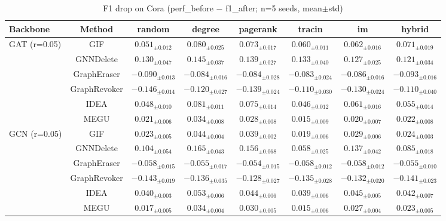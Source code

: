 
\begin{table}[t]
\centering\small
\setlength{\tabcolsep}{4pt}
\caption{F1 drop on Cora (perf\_before $-$ f1\_after; n=5 seeds, mean$\pm$std)}
\label{tab:phaseB-f1_drop-cora}
\begin{tabular}{lccccccc}
\toprule
Backbone & Method & random & degree & pagerank & tracin & im & hybrid \\
\midrule
\multirow{6}{*}{GAT (r=0.05)} & GIF & $0.051_{\pm 0.012}$ & $0.080_{\pm 0.025}$ & $0.073_{\pm 0.017}$ & $0.060_{\pm 0.011}$ & $0.062_{\pm 0.016}$ & $0.071_{\pm 0.019}$ \\
 & GNNDelete & $0.130_{\pm 0.047}$ & $0.145_{\pm 0.037}$ & $0.139_{\pm 0.027}$ & $0.133_{\pm 0.040}$ & $0.127_{\pm 0.025}$ & $0.121_{\pm 0.034}$ \\
 & GraphEraser & $-0.090_{\pm 0.013}$ & $-0.084_{\pm 0.016}$ & $-0.084_{\pm 0.028}$ & $-0.083_{\pm 0.024}$ & $-0.086_{\pm 0.016}$ & $-0.093_{\pm 0.016}$ \\
 & GraphRevoker & $-0.146_{\pm 0.014}$ & $-0.120_{\pm 0.027}$ & $-0.139_{\pm 0.024}$ & $-0.110_{\pm 0.030}$ & $-0.130_{\pm 0.024}$ & $-0.110_{\pm 0.040}$ \\
 & IDEA & $0.048_{\pm 0.010}$ & $0.081_{\pm 0.011}$ & $0.075_{\pm 0.014}$ & $0.046_{\pm 0.012}$ & $0.061_{\pm 0.016}$ & $0.055_{\pm 0.014}$ \\
 & MEGU & $0.021_{\pm 0.006}$ & $0.034_{\pm 0.008}$ & $0.028_{\pm 0.008}$ & $0.015_{\pm 0.009}$ & $0.020_{\pm 0.007}$ & $0.022_{\pm 0.008}$ \\
\midrule
\multirow{6}{*}{GCN (r=0.05)} & GIF & $0.023_{\pm 0.005}$ & $0.044_{\pm 0.004}$ & $0.039_{\pm 0.002}$ & $0.019_{\pm 0.006}$ & $0.029_{\pm 0.006}$ & $0.024_{\pm 0.003}$ \\
 & GNNDelete & $0.104_{\pm 0.054}$ & $0.165_{\pm 0.043}$ & $0.156_{\pm 0.068}$ & $0.058_{\pm 0.025}$ & $0.137_{\pm 0.042}$ & $0.085_{\pm 0.018}$ \\
 & GraphEraser & $-0.058_{\pm 0.015}$ & $-0.055_{\pm 0.017}$ & $-0.054_{\pm 0.015}$ & $-0.058_{\pm 0.012}$ & $-0.058_{\pm 0.012}$ & $-0.055_{\pm 0.010}$ \\
 & GraphRevoker & $-0.143_{\pm 0.019}$ & $-0.136_{\pm 0.035}$ & $-0.128_{\pm 0.027}$ & $-0.135_{\pm 0.028}$ & $-0.132_{\pm 0.020}$ & $-0.141_{\pm 0.023}$ \\
 & IDEA & $0.040_{\pm 0.003}$ & $0.053_{\pm 0.006}$ & $0.044_{\pm 0.006}$ & $0.039_{\pm 0.006}$ & $0.045_{\pm 0.005}$ & $0.042_{\pm 0.007}$ \\
 & MEGU & $0.017_{\pm 0.005}$ & $0.034_{\pm 0.004}$ & $0.030_{\pm 0.005}$ & $0.015_{\pm 0.006}$ & $0.027_{\pm 0.004}$ & $0.023_{\pm 0.005}$ \\
\bottomrule
\end{tabular}
\end{table}

